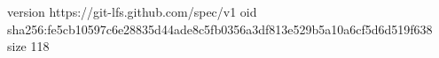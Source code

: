 version https://git-lfs.github.com/spec/v1
oid sha256:fe5cb10597c6e28835d44ade8c5fb0356a3df813e529b5a10a6cf5d6d519f638
size 118
